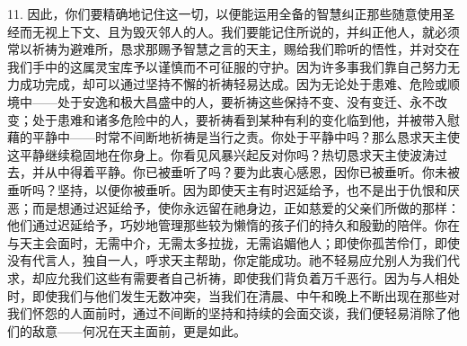 11. 因此，你们要精确地记住这一切，以便能运用全备的智慧纠正那些随意使用圣经而无视上下文、且为毁灭邻人的人。我们要能记住所说的，并纠正他人，就必须常以祈祷为避难所，恳求那赐予智慧之言的天主，赐给我们聆听的悟性，并对交在我们手中的这属灵宝库予以谨慎而不可征服的守护。因为许多事我们靠自己努力无力成功完成，却可以通过坚持不懈的祈祷轻易达成。因为无论处于患难、危险或顺境中——处于安逸和极大昌盛中的人，要祈祷这些保持不变、没有变迁、永不改变；处于患难和诸多危险中的人，要祈祷看到某种有利的变化临到他，并被带入慰藉的平静中——时常不间断地祈祷是当行之责。你处于平静中吗？那么恳求天主使这平静继续稳固地在你身上。你看见风暴兴起反对你吗？热切恳求天主使波涛过去，并从中得着平静。你已被垂听了吗？要为此衷心感恩，因你已被垂听。你未被垂听吗？坚持，以便你被垂听。因为即使天主有时迟延给予，也不是出于仇恨和厌恶；而是想通过迟延给予，使你永远留在祂身边，正如慈爱的父亲们所做的那样：他们通过迟延给予，巧妙地管理那些较为懒惰的孩子们的持久和殷勤的陪伴。你在与天主会面时，无需中介，无需太多拉拢，无需谄媚他人；即使你孤苦伶仃，即使没有代言人，独自一人，呼求天主帮助，你定能成功。祂不轻易应允别人为我们代求，却应允我们这些有需要者自己祈祷，即使我们背负着万千恶行。因为与人相处时，即使我们与他们发生无数冲突，当我们在清晨、中午和晚上不断出现在那些对我们怀怨的人面前时，通过不间断的坚持和持续的会面交谈，我们便轻易消除了他们的敌意——何况在天主面前，更是如此。\par

